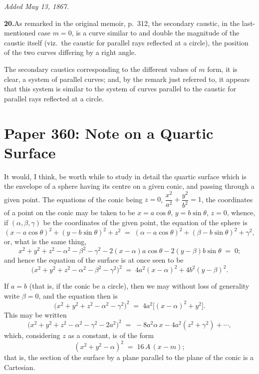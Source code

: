 \documentclass[11pt]{article}
\begin{document}
\begin{center}
\textit{Added May 13, 1867.}
\end{center}

\textbf{20.}\quad As remarked in the original memoir, p.~312, the secondary caustic, in the last-mentioned case $m = 0$, is a curve similar to and double the magnitude of the caustic itself (viz.\ the caustic for parallel rays reflected at a circle), the position of the two curves differing by a right angle.

The secondary caustics corresponding to the different values of $m$ form, it is clear, a system of parallel curves; and, by the remark just referred to, it appears that this system is similar to the system of curves parallel to the caustic for parallel rays reflected at a circle.

\bigskip
\section*{Paper 360: Note on a Quartic Surface}

\medskip{}

\medskip

It would, I think, be worth while to study in detail the quartic surface which is the envelope of a sphere having its centre on a given conic, and passing through a given point. The equations of the conic being $z = 0$, $\dfrac{x^{2}}{a^{2}} + \dfrac{y^{2}}{b^{2}} = 1$, the coordinates of a point on the conic may be taken to be $x = a\cos\theta$, $y = b\sin\theta$, $z = 0$, whence, if $(\alpha, \beta, \gamma)$ be the coordinates of the given point, the equation of the sphere is
\[
(x - a\cos\theta)^{2} + (y - b\sin\theta)^{2} + z^{2} \;=\; (\alpha - a\cos\theta)^{2} + (\beta - b\sin\theta)^{2} + \gamma^{2},
\]
or, what is the same thing,
\[
x^{2} + y^{2} + z^{2} - \alpha^{2} - \beta^{2} - \gamma^{2} - 2(x - \alpha)a\cos\theta - 2(y - \beta)b\sin\theta \;=\; 0;
\]
and hence the equation of the surface is at once seen to be
\[
\bigl(x^{2} + y^{2} + z^{2} - \alpha^{2} - \beta^{2} - \gamma^{2}\bigr)^{2} \;=\; 4 a^{2}(x - \alpha)^{2} + 4 b^{2}(y - \beta)^{2}.
\]

If $a = b$ (that is, if the conic be a circle), then we may without loss of generality write $\beta = 0$, and the equation then is
\[
\bigl(x^{2} + y^{2} + z^{2} - \alpha^{2} - \gamma^{2}\bigr)^{2} \;=\; 4 a^{2}\bigl[(x - \alpha)^{2} + y^{2}\bigr].
\]
This may be written
\[
\bigl(x^{2} + y^{2} + z^{2} - \alpha^{2} - \gamma^{2} - 2 a^{2}\bigr)^{2} \;=\; -8 a^{2}\alpha\,x - 4 a^{2}(z^{2} + \gamma^{2}) + \cdots,
\]
which, considering $z$ as a constant, is of the form
\[
(x^{2} + y^{2} - \alpha)^{2} \;=\; 16\,A\,(x - m);
\]
that is, the section of the surface by a plane parallel to the plane of the conic is a Cartesian.
\end{document}
